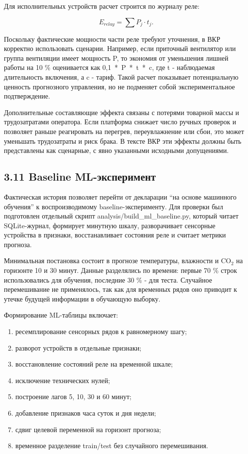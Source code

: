 \documentclass[a4paper,14pt]{extarticle}
\renewcommand{\texttt}[1]{\textnormal{#1}}
\providecommand{\tightlist}{%
  \setlength{\itemsep}{0pt}\setlength{\parskip}{0pt}}
\begin{document}
Для исполнительных устройств расчет строится по журналу реле:

\[
E_{relay} = \sum P_j \cdot t_j.
\]

Поскольку фактические мощности части реле требуют уточнения, в ВКР
корректно использовать сценарии. Например, если приточный вентилятор или
группа вентиляции имеет мощность \texttt{P}, то экономия от уменьшения
лишней работы на 10 \% оценивается как \texttt{0,1\ *\ P\ *\ t\ *\ c},
где \texttt{t} - наблюдаемая длительность включения, а \texttt{c} -
тариф. Такой расчет показывает потенциальную ценность прогнозного
управления, но не подменяет собой экспериментальное подтверждение.

Дополнительные составляющие эффекта связаны с потерями товарной массы и
трудозатратами оператора. Если платформа снижает число ручных проверок и
позволяет раньше реагировать на перегрев, переувлажнение или сбои, это
может уменьшать трудозатраты и риск брака. В тексте ВКР эти эффекты
должны быть представлены как сценарные, с явно указанными исходными
допущениями.

\subsection{3.11 Baseline
ML-эксперимент}\label{baseline-ml-ux44dux43aux441ux43fux435ux440ux438ux43cux435ux43dux442}

Фактическая история позволяет перейти от декларации ``на основе
машинного обучения'' к воспроизводимому baseline-эксперименту. Для
проверки был подготовлен отдельный скрипт
\texttt{analysis/build\_ml\_baseline.py}, который читает SQLite-журнал,
формирует минутную шкалу, разворачивает сенсорные устройства в признаки,
восстанавливает состояния реле и считает метрики прогноза.

Минимальная постановка состоит в прогнозе температуры, влажности и
CO\(_2\) на горизонте 10 и 30 минут. Данные разделялись по времени:
первые 70 \% строк использовались для обучения, последние 30 \% - для
теста. Случайное перемешивание не применялось, так как для временных
рядов оно приводит к утечке будущей информации в обучающую выборку.

Формирование ML-таблицы включает:

\begin{enumerate}
\def\labelenumi{\arabic{enumi})}
\tightlist
\item
  ресемплирование сенсорных рядов к равномерному шагу;
\item
  разворот устройств в отдельные признаки;
\item
  восстановление состояний реле на временной шкале;
\item
  исключение технических нулей;
\item
  построение лагов 5, 10, 30 и 60 минут;
\item
  добавление признаков часа суток и дня недели;
\item
  сдвиг целевой переменной на горизонт прогноза;
\item
  временное разделение train/test без случайного перемешивания.
\end{enumerate}
\end{document}
